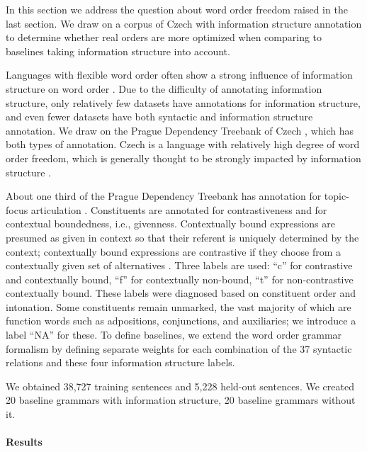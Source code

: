 

In this section we address the question about word order freedom raised in the last section.
We draw on a corpus of Czech with information structure annotation to determine whether real orders are more optimized when comparing to baselines taking information structure into account.



Languages with flexible word order often show a strong influence of information structure on word order \citep{givon1988pragmatics,jacobs1988probleme,neeleman2016word}.
Due to the difficulty of annotating information structure, only relatively few datasets have annotations for information structure, and even fewer datasets have both syntactic and information structure annotation.
We draw on the Prague Dependency Treebank of Czech \citep{bohmova2003prague,mikulova2006annotation}, which has both types of annotation.
Czech is a language with relatively high degree of word order freedom, which is generally thought to be strongly impacted by information structure \citep{firbas1966defining,firbas1974aspects}.

About one third of the Prague Dependency Treebank has annotation for topic-focus articulation \citep{mikulova2006annotation}.
Constituents are annotated for contrastiveness and for contextual boundedness, i.e., givenness.
Contextually bound expressions are presumed as given in context so that their referent is uniquely determined by the context; contextually bound expressions are contrastive if they choose from a contextually given set of alternatives \citep[Section 10.2]{mikulova2006annotation}.
Three labels are used:
``c'' for contrastive and contextually bound, ``f'' for contextually non-bound, ``t'' for non-contrastive contextually bound.
These labels were diagnosed based on constituent order and intonation.
Some constituents remain unmarked, the vast majority of which are function words such as adpositions, conjunctions, and auxiliaries; we introduce a label ``NA'' for these.
To define baselines, we extend the word order grammar formalism by defining separate weights for each combination of the 37 syntactic relations and these four information structure labels.

We obtained 38,727 training sentences and 5,228 held-out sentences. We created 20 baseline grammars with information structure, 20 baseline grammars without it.

\paragraph{Results}


